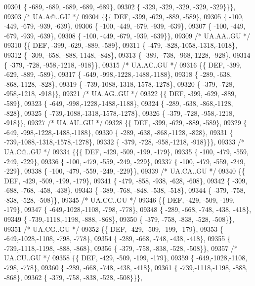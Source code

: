 \begin{DoxyCode}
09301 \{ -689, -689, -689, -689, -689\},
09302 \{ -329, -329, -329, -329, -329\}\}\},
09303 \textcolor{comment}{/* UA.A@..GU */}
09304 \{\{\{  DEF, -399, -629, -889, -589\},
09305 \{ -100, -449, -679, -939, -639\},
09306 \{ -100, -449, -679, -939, -639\},
09307 \{ -100, -449, -679, -939, -639\},
09308 \{ -100, -449, -679, -939, -639\}\},
09309 \textcolor{comment}{/* UA.AA..GU */}
09310 \{\{  DEF, -399, -629, -889, -589\},
09311 \{ -479, -828,-1058,-1318,-1018\},
09312 \{ -309, -658, -888,-1148, -848\},
09313 \{ -389, -738, -968,-1228, -928\},
09314 \{ -379, -728, -958,-1218, -918\}\},
09315 \textcolor{comment}{/* UA.AC..GU */}
09316 \{\{  DEF, -399, -629, -889, -589\},
09317 \{ -649, -998,-1228,-1488,-1188\},
09318 \{ -289, -638, -868,-1128, -828\},
09319 \{ -739,-1088,-1318,-1578,-1278\},
09320 \{ -379, -728, -958,-1218, -918\}\},
09321 \textcolor{comment}{/* UA.AG..GU */}
09322 \{\{  DEF, -399, -629, -889, -589\},
09323 \{ -649, -998,-1228,-1488,-1188\},
09324 \{ -289, -638, -868,-1128, -828\},
09325 \{ -739,-1088,-1318,-1578,-1278\},
09326 \{ -379, -728, -958,-1218, -918\}\},
09327 \textcolor{comment}{/* UA.AU..GU */}
09328 \{\{  DEF, -399, -629, -889, -589\},
09329 \{ -649, -998,-1228,-1488,-1188\},
09330 \{ -289, -638, -868,-1128, -828\},
09331 \{ -739,-1088,-1318,-1578,-1278\},
09332 \{ -379, -728, -958,-1218, -918\}\}\},
09333 \textcolor{comment}{/* UA.C@..GU */}
09334 \{\{\{  DEF, -429, -509, -199, -179\},
09335 \{ -100, -479, -559, -249, -229\},
09336 \{ -100, -479, -559, -249, -229\},
09337 \{ -100, -479, -559, -249, -229\},
09338 \{ -100, -479, -559, -249, -229\}\},
09339 \textcolor{comment}{/* UA.CA..GU */}
09340 \{\{  DEF, -429, -509, -199, -179\},
09341 \{ -479, -858, -938, -628, -608\},
09342 \{ -309, -688, -768, -458, -438\},
09343 \{ -389, -768, -848, -538, -518\},
09344 \{ -379, -758, -838, -528, -508\}\},
09345 \textcolor{comment}{/* UA.CC..GU */}
09346 \{\{  DEF, -429, -509, -199, -179\},
09347 \{ -649,-1028,-1108, -798, -778\},
09348 \{ -289, -668, -748, -438, -418\},
09349 \{ -739,-1118,-1198, -888, -868\},
09350 \{ -379, -758, -838, -528, -508\}\},
09351 \textcolor{comment}{/* UA.CG..GU */}
09352 \{\{  DEF, -429, -509, -199, -179\},
09353 \{ -649,-1028,-1108, -798, -778\},
09354 \{ -289, -668, -748, -438, -418\},
09355 \{ -739,-1118,-1198, -888, -868\},
09356 \{ -379, -758, -838, -528, -508\}\},
09357 \textcolor{comment}{/* UA.CU..GU */}
09358 \{\{  DEF, -429, -509, -199, -179\},
09359 \{ -649,-1028,-1108, -798, -778\},
09360 \{ -289, -668, -748, -438, -418\},
09361 \{ -739,-1118,-1198, -888, -868\},
09362 \{ -379, -758, -838, -528, -508\}\}\},

\end{DoxyCode}
